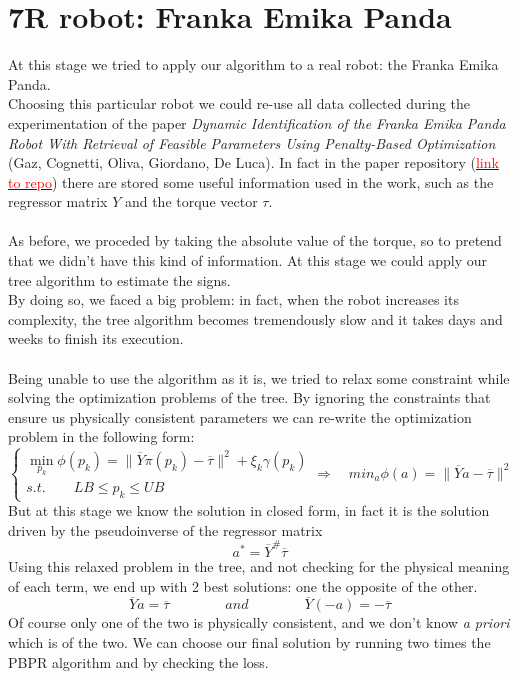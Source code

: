 \documentclass{article}
\begin{document}
\pagebreak
\section{7R robot: Franka Emika Panda}
At this stage we tried to apply our algorithm to a real robot: the Franka Emika Panda.\\
Choosing this particular robot we could re-use all data collected during the experimentation of the paper \emph{Dynamic Identification of the Franka Emika Panda Robot With Retrieval of Feasible Parameters Using Penalty-Based Optimization} (Gaz, Cognetti, Oliva, Giordano, De Luca). In fact in the paper repository (\href{https://github.com/marcocognetti/FrankaEmikaPandaDynModel}{\textcolor{red}{link to repo}}) there are stored some useful information used in the work, such as the regressor matrix $Y$ and the torque vector $\tau$.\\\\
As before, we proceded by taking the absolute value of the torque, so to pretend that we didn't have this kind of information. At this stage we could apply our tree algorithm to estimate the signs.\\
By doing so, we faced a big problem: in fact, when the robot increases its complexity, the tree algorithm becomes tremendously slow and it takes days and weeks to finish its execution.\\\\
Being unable to use the algorithm as it is, we tried to relax some constraint while solving the optimization problems of the tree. By ignoring the constraints that ensure us physically consistent parameters we can re-write the optimization problem in the following form:
\[\begin{cases}\min_{p_k}{\phi(p_k)} = \lVert \overline{Y}\pi(p_k)-\overline{\tau} \rVert^2 + \xi_k \gamma(p_k)\\s.t. \qquad LB\le p_k \le UB\end{cases} \Rightarrow \quad min_{a}{\phi(a)} = \lVert \overline{Y}a-\overline{\tau} \rVert^2\]
But at this stage we know the solution in closed form, in fact it is the solution driven by the pseudoinverse of the regressor matrix
\[a^* = \overline{Y}^{\#}\overline{\tau}\]
Using this relaxed problem in the tree, and not checking for the physical meaning of each term, we end up with 2 best solutions: one the opposite of the other.
\[\overline{Y}a = \overline{\tau} \qquad \qquad and \qquad \qquad \overline{Y}(-a) = -\overline{\tau}\]
Of course only one of the two is physically consistent, and we don't know \emph{a priori} which is of the two. We can choose our final solution by running two times the PBPR algorithm and by checking the loss.\\\\
\end{document}
